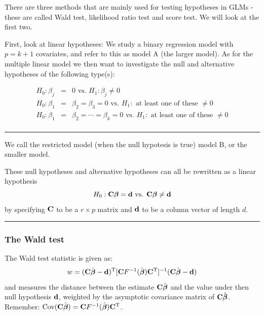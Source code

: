 \documentclass[
]{article}
\begin{document}
There are three methods that are mainly used for testing hypotheses in
GLMs - these are called Wald test, likelihood ratio test and score test.
We will look at the first two.

First, look at linear hypotheses: We study a binary regression model
with \(p=k+1\) covariates, and refer to this as model A (the larger
model). As for the multiple linear model we then want to investigate the
null and alternative hypotheses of the following type(s):

\begin{eqnarray*}
 H_0: \beta_{j}&=&0 \text{ vs. } H_1:\beta_j\neq 0\\
 H_0: \beta_{1}&=&\beta_{2}=\beta_{3}=0 \text{ vs. } H_1:\text{ at least one of these }\neq 0\\
 H_0: \beta_{1}&=&\beta_{2}=\cdots=\beta_{k}=0 \text{ vs. } H_1:\text{ at least one of these }\neq 0\\
 \end{eqnarray*}

\begin{center}\rule{0.5\linewidth}{0.5pt}\end{center}

We call the restricted model (when the null hypotesis is true) model B,
or the smaller model.

These null hypotheses and alternative hypotheses can all be rewritten as
a linear hypothesis
\[H_0: {\bf C}{\bf \boldsymbol{\beta}}={\bf d} \text{ vs. } {\bf C}{\bf \boldsymbol{\beta}}\neq {\bf d} \]
by specifying \({\bf C}\) to be a \(r \times p\) matrix and \({\bf d}\)
to be a column vector of length \(d\).

\begin{center}\rule{0.5\linewidth}{0.5pt}\end{center}

\hypertarget{the-wald-test}{%
\subsubsection{The Wald test}\label{the-wald-test}}

The Wald test statistic is given as:
\[w=({\bf C}\hat{{\bf \boldsymbol{\beta}}}-{\bf d})^{\text T}[{\bf C}F^{-1}(\hat{\boldsymbol{\beta}}){\bf C}^{\text T}]^{-1}({\bf C}\hat{{\bf \boldsymbol{\beta}}}-{\bf d}) \]
and measures the distance between the estimate
\({\bf C}\hat{\boldsymbol{\beta}}\) and the value under then null
hypothesis \({\bf d}\), weighted by the asymptotic covariance matrix of
\({\bf C}\hat{\boldsymbol{\beta}}\). Remember:
\(\text{Cov}({\bf C}\hat{\boldsymbol{\beta}})={\bf C}F^{-1}(\hat{\boldsymbol{\beta}}){\bf C}^{\text T}\).
\end{document}
